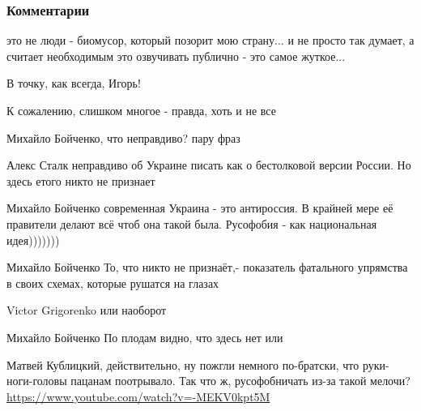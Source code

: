  
 
 
 
 
\subsubsection{Комментарии}

\begin{itemize}

это не люди - биомусор, который позорит мою страну... и не просто так думает, а
считает необходимым это озвучивать публично - это самое жуткое...


В точку, как всегда, Игорь!


К сожалению, слишком многое - правда, хоть и не все

\begin{itemize}

Михайло Бойченко, что неправдиво? пару фраз


Алекс Сталк неправдиво об Украине писать как о бестолковой версии России. Но здесь етого никто не признает


Михайло Бойченко современная Украина - это антироссия. В крайней мере её правители делают всё чтоб она такой была. Русофобия - как национальная идея)))))))


Михайло Бойченко То, что никто не признаёт,- показатель фатального упрямства в своих схемах, которые рушатся на глазах


Victor Grigorenko или наоборот


Михайло Бойченко По плодам видно, что здесь нет или

Матвей Кублицкий, действительно, ну пожгли немного по-братски, что
руки-ноги-головы пацанам поотрывало. Так что ж, русофобничать из-за такой
мелочи? \url{https://www.youtube.com/watch?v=-MEKV0kpt5M}
\end{itemize}


\end{itemize}
